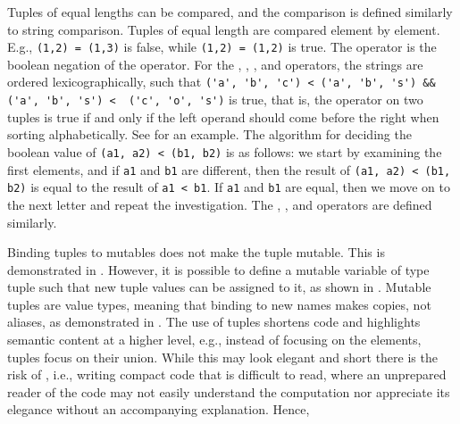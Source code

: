 \documentclass[fsharpnotes.tex]{subfiles}
\begin{document}
Tuples of equal lengths can be compared, and the  comparison is defined similarly to string comparison. Tuples of equal length are compared element by element. E.g., \lstinline!(1,2) = (1,3)! is false, while \lstinline!(1,2) = (1,2)! is true. The \lexeme{<>} operator is the boolean negation of the \lexeme{=} operator. For the \lexeme{<} , \lexeme{<=}, \lexeme{>}, and \lexeme{>=} operators, the strings are ordered lexicographically, such that \lstinline!('a', 'b', 'c') < ('a', 'b', 's') && ('a', 'b', 's') <  ('c', 'o', 's')! is true, that is, the \lexeme{<} operator on two tuples is true if and only if the left operand should come before the right when sorting alphabetically. See  for an example.
%
%
The algorithm for deciding the boolean value of \lstinline!(a1, a2) < (b1, b2)! is as follows: we start by examining the first elements, and if \lstinline!a1! and \lstinline!b1! are different, then the result of \lstinline!(a1, a2) < (b1, b2)! is equal to the result of \lstinline!a1 < b1!. If \lstinline!a1! and \lstinline!b1! are equal, then we move on to the next letter and repeat the investigation. The \lexeme{<=}, \lexeme{>}, and \lexeme{>=} operators are defined similarly.

Binding tuples to mutables does not make the tuple mutable. This is demonstrated in .
%
%
However, it is possible to define a mutable variable of type tuple such that new tuple values can be assigned to it, as shown in .
%
%
Mutable tuples are value types, meaning that binding to new names makes copies, not aliases, as demonstrated in .
%
%
The use of tuples shortens code and highlights semantic content at a higher level, e.g., instead of focusing on the elements, tuples focus on their union. While this may look elegant and short there is the risk of , i.e., writing compact code that is difficult to read, where an unprepared reader of the code may not easily understand the computation nor appreciate its elegance without an accompanying explanation.  Hence, 
\end{document}
